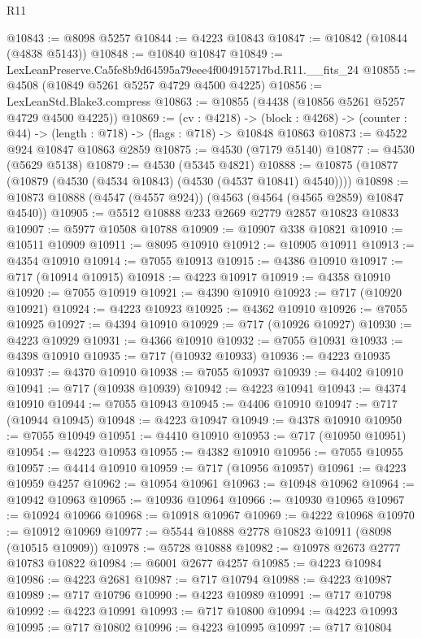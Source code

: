 \begin{lexlean}{R11}
\begin{coremodule}
@10843 := @8098 @5257
@10844 := @4223 @10843
@10847 := @10842 (@10844 (@4838 @5143))
@10848 := @10840 @10847
@10849 := LexLeanPreserve.Ca5fe8b9d64595a79eee4f004915717bd.R11.__fits_24
@10855 := @4508 (@10849 @5261 @5257 @4729 @4500 @4225)
@10856 := LexLeanStd.Blake3.compress
@10863 := @10855 (@4438 (@10856 @5261 @5257 @4729 @4500 @4225))
@10869 := (cv : @4218) ->
  (block : @4268) -> (counter : @44) -> (length : @718) -> (flags : @718) -> @10848 @10863
@10873 := @4522 @924 @10847 @10863 @2859
@10875 := @4530 (@7179 @5140)
@10877 := @4530 (@5629 @5138)
@10879 := @4530 (@5345 @4821)
@10888 := @10875 (@10877 (@10879 (@4530 (@4534 @10843) (@4530 (@4537 @10841) @4540))))
@10898 := @10873 @10888 (@4547 (@4557 @924)) (@4563 (@4564 (@4565 @2859) @10847 @4540))
@10905 := @5512 @10888 @233 @2669 @2779 @2857 @10823 @10833
@10907 := @5977 @10508 @10788
@10909 := @10907 @338 @10821
@10910 := @10511 @10909
@10911 := @8095 @10910
@10912 := @10905 @10911
@10913 := @4354 @10910
@10914 := @7055 @10913
@10915 := @4386 @10910
@10917 := @717 (@10914 @10915)
@10918 := @4223 @10917
@10919 := @4358 @10910
@10920 := @7055 @10919
@10921 := @4390 @10910
@10923 := @717 (@10920 @10921)
@10924 := @4223 @10923
@10925 := @4362 @10910
@10926 := @7055 @10925
@10927 := @4394 @10910
@10929 := @717 (@10926 @10927)
@10930 := @4223 @10929
@10931 := @4366 @10910
@10932 := @7055 @10931
@10933 := @4398 @10910
@10935 := @717 (@10932 @10933)
@10936 := @4223 @10935
@10937 := @4370 @10910
@10938 := @7055 @10937
@10939 := @4402 @10910
@10941 := @717 (@10938 @10939)
@10942 := @4223 @10941
@10943 := @4374 @10910
@10944 := @7055 @10943
@10945 := @4406 @10910
@10947 := @717 (@10944 @10945)
@10948 := @4223 @10947
@10949 := @4378 @10910
@10950 := @7055 @10949
@10951 := @4410 @10910
@10953 := @717 (@10950 @10951)
@10954 := @4223 @10953
@10955 := @4382 @10910
@10956 := @7055 @10955
@10957 := @4414 @10910
@10959 := @717 (@10956 @10957)
@10961 := @4223 @10959 @4257
@10962 := @10954 @10961
@10963 := @10948 @10962
@10964 := @10942 @10963
@10965 := @10936 @10964
@10966 := @10930 @10965
@10967 := @10924 @10966
@10968 := @10918 @10967
@10969 := @4222 @10968
@10970 := @10912 @10969
@10977 := @5544 @10888 @2778 @10823 @10911 (@8098 (@10515 @10909))
@10978 := @5728 @10888
@10982 := @10978 @2673 @2777 @10783 @10822
@10984 := @6001 @2677 @4257
@10985 := @4223 @10984
@10986 := @4223 @2681
@10987 := @717 @10794
@10988 := @4223 @10987
@10989 := @717 @10796
@10990 := @4223 @10989
@10991 := @717 @10798
@10992 := @4223 @10991
@10993 := @717 @10800
@10994 := @4223 @10993
@10995 := @717 @10802
@10996 := @4223 @10995
@10997 := @717 @10804

\end{coremodule}
\end{lexlean}
